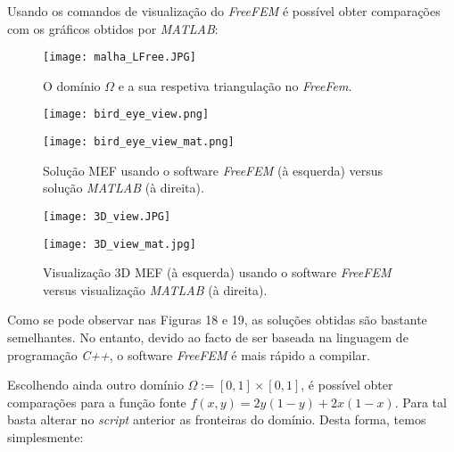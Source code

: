 \documentclass{article}
\theoremstyle{definition}
\theoremstyle{plain}
\numberwithin{equation}{section}
\newcommand{\tab}{\hspace{10mm}}
\begin{document}
\vspace{1mm}

\tab Usando os comandos de visualização do \emph{FreeFEM} é possível obter comparações com os gráficos obtidos por \emph{MATLAB}:

\vspace{5mm}

\begin{figure}[H]
\centering
\texttt{[image: malha\_LFree.JPG]}
\caption{O domínio $\Omega$ e a sua respetiva triangulação no \emph{FreeFem}.}
\end{figure}



\begin{figure} [H]
\centering
\begin{minipage}{0.4\textwidth}
  \centering
  \texttt{[image: bird\_eye\_view.png]}
\end{minipage}%
\begin{minipage}{0.4\textwidth}
  \centering
  \texttt{[image: bird\_eye\_view\_mat.png]}
\end{minipage}
\caption{Solução MEF  usando o software \emph{FreeFEM} (à esquerda) versus solução \emph{MATLAB} (à direita).}
\end{figure}

\begin{figure} [H]
\centering
\begin{minipage}{0.4\textwidth}
  \centering
  \texttt{[image: 3D\_view.JPG]}
\end{minipage}%
\begin{minipage}{0.4\textwidth}
  \centering
  \texttt{[image: 3D\_view\_mat.jpg]}
\end{minipage}
\caption{Visualização 3D MEF (à esquerda) usando o software \emph{FreeFEM} versus visualização \emph{MATLAB} (à direita).}
\end{figure}

\tab Como se pode observar nas Figuras 18 e 19, as soluções obtidas são bastante semelhantes. No entanto, devido ao facto de ser baseada na linguagem de programação \emph{C++}, o software \emph{FreeFEM} é mais rápido a compilar.

\tab Escolhendo ainda outro domínio $\Omega:=[0,1]\times[0,1]$, é possível obter comparações para a função fonte $f(x,y)=2y(1-y)+2x(1-x)$. Para tal basta alterar no \emph{script} anterior as fronteiras do domínio. Desta forma, temos simplesmente:
\end{document}
